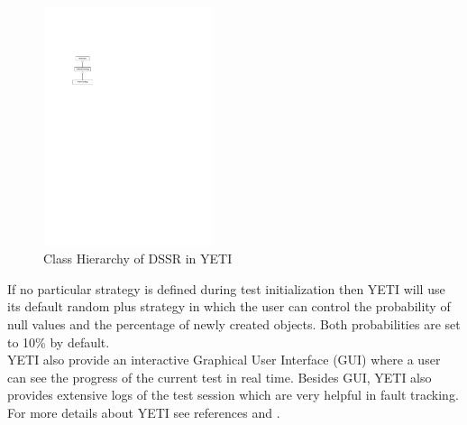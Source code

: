 \begin{figure}[htp]
\centering
\includegraphics[width=5cm,height=7cm]{figures/hierarchy.pdf}
\caption{Class Hierarchy of DSSR in YETI}
\label{fig:hierarchyofDSSR}
\end{figure}


If no particular strategy is defined during test initialization then YETI will use its default random plus strategy in which the user can control the probability of null values and the percentage of newly created objects. Both probabilities are set to 10\% by default. \\

YETI also provide an interactive Graphical User Interface (GUI) where a user can see the progress of the current test in real time. Besides GUI, YETI also provides extensive logs of the test session which are very helpful in fault tracking. For more details about YETI see references \cite{Oriol2010a} and \cite{Oriol2010}.
